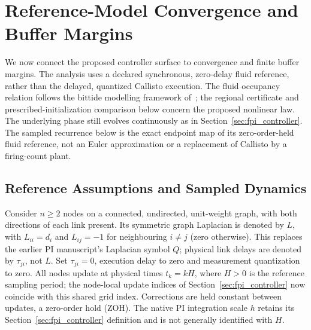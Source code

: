 \section{Reference-Model Convergence and Buffer Margins}
\label{sec:btd_reference}

We now connect the proposed controller surface to convergence and finite
buffer margins. The analysis uses a declared synchronous, zero-delay fluid
reference, rather than the delayed, quantized Callisto execution. The
fluid occupancy relation follows the bittide modelling framework
of~\cite{lall2024logicalSynchrony,lall2022resistance}; the regional
certificate and prescribed-initialization comparison below concern the
proposed nonlinear law. The underlying phase still evolves continuously
as in Section~\ref{sec:fpi_controller}. The sampled recurrence below is the exact endpoint
map of its zero-order-held fluid reference, not an Euler approximation
or a replacement of Callisto by a firing-count plant.

\subsection{Reference Assumptions and Sampled Dynamics}
\label{subsec:btd_ref_model}

Consider $n\ge2$ nodes on a connected, undirected, unit-weight graph, with both
directions of each link present. Its symmetric graph Laplacian is denoted
by $L$, with $L_{ii}=d_i$ and $L_{ij}=-1$ for neighbouring $i\ne j$
(zero otherwise). This replaces the earlier PI manuscript's Laplacian symbol $Q$;
physical link delays are denoted by $\tau_{ji}$, not $L$. Set
$\tau_{ji}=0$, execution delay to zero and measurement quantization to zero.
All nodes update at physical times $t_k=kH$, where $H>0$ is the reference
sampling period; the node-local update indices of Section~\ref{sec:fpi_controller} now
coincide with this shared grid index. Corrections are held constant between updates, a
zero-order hold (ZOH). The native PI integration scale $h$ retains its
Section~\ref{sec:fpi_controller} definition and is not generally identified with $H$.

